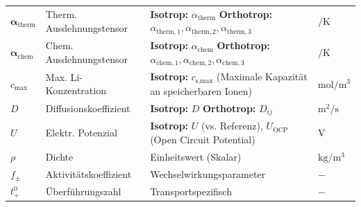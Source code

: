 \begin{table}[!ht]
\begin{tabularx}{\textwidth}{@{}llYl@{}}
    $\boldsymbol{\alpha}_\text{therm}$ & Therm. Ausdehnungstensor & \textbf{Isotrop:} $\alpha_\text{therm}$ \newline \textbf{Orthotrop:} $\alpha_{\text{therm},1}, \alpha_{\text{therm},2}, \alpha_{\text{therm},3}$ & $\si{\per\kelvin}$ \\ \addlinespace
    $\boldsymbol{\alpha}_\text{chem}$ & Chem. Ausdehnungstensor & \textbf{Isotrop:} $\alpha_\text{chem}$ \newline \textbf{Orthotrop:} $\alpha_{\text{chem},1}, \alpha_{\text{chem},2}, \alpha_{\text{chem},3}$ & $\si{\per\kelvin}$ \\ \addlinespace
    $c_{\text{max}}$ & Max. Li-Konzentration & \textbf{Isotrop:} $c_{\text{s,max}}$ (Maximale Kapazität an speicherbaren Ionen) & $\si{\mole\per\metre\cubed}$ \\ \addlinespace
    $D$ & Diffusionskoeffizient & \textbf{Isotrop:} $D$ \newline \textbf{Orthotrop:} $D_{ij}$ & $\si{\metre\squared\per\second}$ \\ \addlinespace
    $U$ & Elektr. Potenzial & \textbf{Isotrop:} $U$ (vs. Referenz), $U_{\text{OCP}}$ (Open Circuit Potential) & $\si{\volt}$ \\ \addlinespace
    $\rho$ & Dichte & Einheitswert (Skalar) & $\si{\kilo\gram\per\metre\cubed}$ \\ \addlinespace
    $f_{\pm}$ & Aktivitätskoeffizient & Wechselwirkungsparameter & $-$ \\ \addlinespace
    $t^0_+$ & Überführungszahl & Transportspezifisch & $-$ \\ \bottomrule
    \end{tabularx}
\end{table}